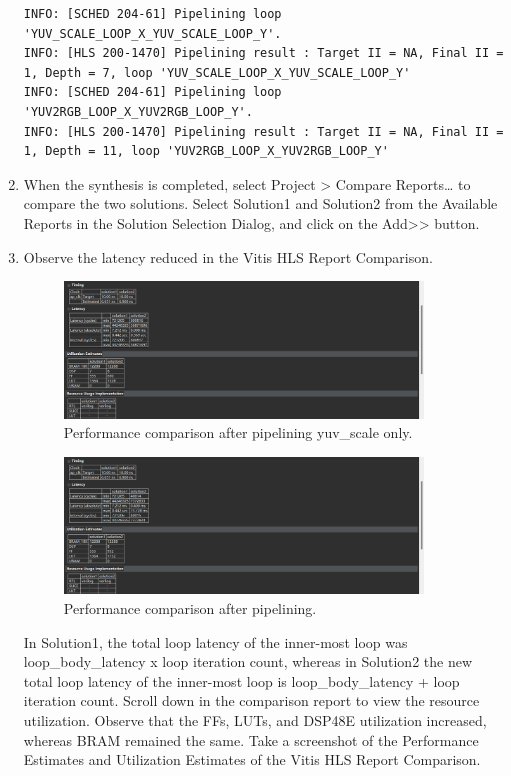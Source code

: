 \documentclass[a4paper,12pt,twoside]{article}
\begin{document}
\begin{enumerate}
\begin{verbatim}
INFO: [SCHED 204-61] Pipelining loop 'YUV_SCALE_LOOP_X_YUV_SCALE_LOOP_Y'.
INFO: [HLS 200-1470] Pipelining result : Target II = NA, Final II = 1, Depth = 7, loop 'YUV_SCALE_LOOP_X_YUV_SCALE_LOOP_Y'
INFO: [SCHED 204-61] Pipelining loop 'YUV2RGB_LOOP_X_YUV2RGB_LOOP_Y'.
INFO: [HLS 200-1470] Pipelining result : Target II = NA, Final II = 1, Depth = 11, loop 'YUV2RGB_LOOP_X_YUV2RGB_LOOP_Y'
    \end{verbatim}
    \item When the synthesis is completed, select Project > Compare Reports… to compare the two solutions. Select Solution1 and Solution2 from the Available Reports in the Solution Selection Dialog, and click on the Add>> button.
    \item Observe the latency reduced in the Vitis HLS Report Comparison.
    \begin{figure}[H]
        \centering
        \includegraphics[width=0.9\textwidth]{images/5.png}
        \caption{Performance comparison after pipelining yuv\_scale only.}
    \end{figure}
    \begin{figure}[H]
        \centering
        \includegraphics[width=0.9\textwidth]{images/6.png}
        \caption{Performance comparison after pipelining.}
    \end{figure}
    In Solution1, the total loop latency of the inner-most loop was loop\_body\_latency x loop iteration count, whereas in Solution2 the new total loop latency of the inner-most loop is loop\_body\_latency + loop iteration count. Scroll down in the comparison report to view the resource utilization. Observe that the FFs, LUTs, and DSP48E utilization increased, whereas BRAM remained the same. Take a screenshot of the Performance Estimates and Utilization Estimates of the Vitis HLS Report Comparison.
\end{enumerate}
\end{document}
